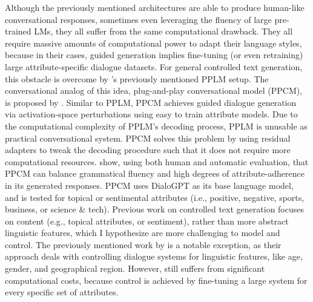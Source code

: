 Although the previously mentioned architectures are able to produce human-like conversational responses, sometimes even leveraging the fluency of large pre-trained LMs, they all suffer from the same computational drawback. They all require massive amounts of computational power to adapt their language styles, because in their cases, guided generation implies fine-tuning (or even retraining) large attribute-specific dialogue datasets. For general controlled text generation, this obstacle is overcome by \cite{dathathri2019plug}'s previously mentioned PPLM setup. The conversational analog of this idea, plug-and-play conversational model (PPCM), is proposed by \cite{madotto-etal-2020-plug}. Similar to PPLM, PPCM achieves guided dialogue generation via activation-space perturbations using easy to train attribute models. 
Due to the computational complexity of PPLM's decoding process, PPLM is unusable as practical conversational system. PPCM solves this problem by using residual adapters \citep{bapna-firat-2019-simple} to tweak the decoding procedure such that it does not require more computational resources. 
\cite{madotto-etal-2020-plug} show, using both human and automatic evaluation, that PPCM can balance grammatical fluency and high degrees of attribute-adherence in its generated responses. PPCM uses DialoGPT as its base language model, and is tested for topical or sentimental attributes (i.e., positive, negative, sports, business, or science \& tech). 
Previous work on controlled text generation focuses on content (e.g., topical attributes, or sentiment), rather than more abstract linguistic features, which I hypothesize are more challenging to model and control. The previously mentioned work by \cite{zheng2019personalized} is a notable exception, as their approach deals with controlling dialogue systems for linguistic features, like age, gender, and geographical region. However, \cite{zheng2019personalized} still suffers from significant computational costs, because control is achieved by fine-tuning a large system for every specific set of attributes. 

